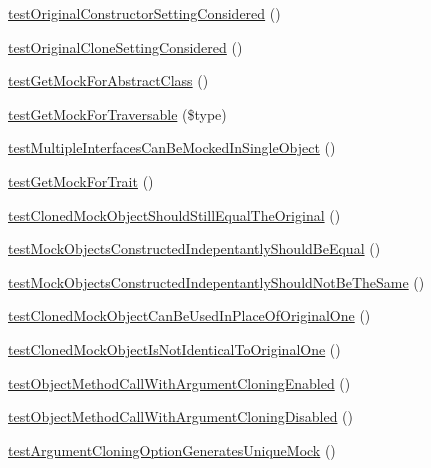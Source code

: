 \begin{DoxyCompactItemize}
\item 
\mbox{\hyperlink{class_framework___mock_object_test_a5aaca07c4eeb153ee0e928c5bf0f6999}{test\+Original\+Constructor\+Setting\+Considered}} ()
\item 
\mbox{\hyperlink{class_framework___mock_object_test_afa2f135b1299baa4671dd13ec591dc37}{test\+Original\+Clone\+Setting\+Considered}} ()
\item 
\mbox{\hyperlink{class_framework___mock_object_test_a48d7706960ed7d02cd1bc1d393fc35df}{test\+Get\+Mock\+For\+Abstract\+Class}} ()
\item 
\mbox{\hyperlink{class_framework___mock_object_test_aa257a5f625867ec0c34748f78c92b494}{test\+Get\+Mock\+For\+Traversable}} (\$type)
\item 
\mbox{\hyperlink{class_framework___mock_object_test_a7b944c15c6f9e11b90d1bf2e8b94d201}{test\+Multiple\+Interfaces\+Can\+Be\+Mocked\+In\+Single\+Object}} ()
\item 
\mbox{\hyperlink{class_framework___mock_object_test_a8d87db6f1133b9179aafcb4581f34f50}{test\+Get\+Mock\+For\+Trait}} ()
\item 
\mbox{\hyperlink{class_framework___mock_object_test_a834d914e3a3ad35c5c5e7ea21c26525a}{test\+Cloned\+Mock\+Object\+Should\+Still\+Equal\+The\+Original}} ()
\item 
\mbox{\hyperlink{class_framework___mock_object_test_a69e5fd1d6880916bf46331802837bd04}{test\+Mock\+Objects\+Constructed\+Indepentantly\+Should\+Be\+Equal}} ()
\item 
\mbox{\hyperlink{class_framework___mock_object_test_a0bbeaa706ff5a60d6dd0ce6f66fc0462}{test\+Mock\+Objects\+Constructed\+Indepentantly\+Should\+Not\+Be\+The\+Same}} ()
\item 
\mbox{\hyperlink{class_framework___mock_object_test_ab47a4276d886a73470be94efe8982b17}{test\+Cloned\+Mock\+Object\+Can\+Be\+Used\+In\+Place\+Of\+Original\+One}} ()
\item 
\mbox{\hyperlink{class_framework___mock_object_test_a2a1de1e1f3350f28fd88f2b4634efcfb}{test\+Cloned\+Mock\+Object\+Is\+Not\+Identical\+To\+Original\+One}} ()
\item 
\mbox{\hyperlink{class_framework___mock_object_test_a4e3fbe03fce736a894a8212544d955c3}{test\+Object\+Method\+Call\+With\+Argument\+Cloning\+Enabled}} ()
\item 
\mbox{\hyperlink{class_framework___mock_object_test_a2fcb360e69f981d87edb4059420d5289}{test\+Object\+Method\+Call\+With\+Argument\+Cloning\+Disabled}} ()
\item 
\mbox{\hyperlink{class_framework___mock_object_test_a4cbad31dc65d018aca3f68216ed7a3ec}{test\+Argument\+Cloning\+Option\+Generates\+Unique\+Mock}} ()

\end{DoxyCompactItemize}
